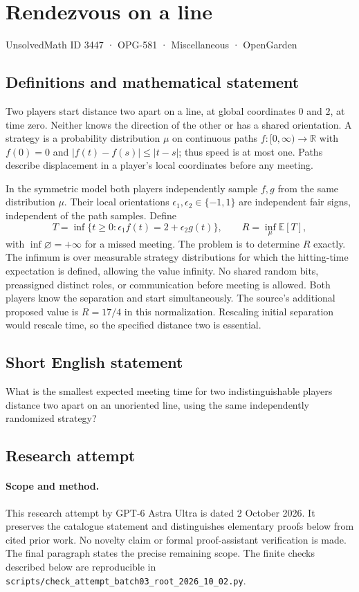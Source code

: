 \documentclass[11pt,a4paper]{article}
\begin{document}
\section*{Rendezvous on a line}\label{3447}
{\small UnsolvedMath ID 3447 · OPG-581 · Miscellaneous · OpenGarden}
\subsection{Definitions and mathematical statement}
Two players start distance two apart on a line, at global coordinates
$0$ and $2$, at time zero. Neither knows the direction of the other
or has a shared orientation. A strategy is a probability distribution
$\mu$ on continuous paths $f:[0,\infty)\to\mathbb R$ with $f(0)=0$
and $|f(t)-f(s)|\le|t-s|$; thus speed is at most one. Paths describe
displacement in a player's local coordinates before any meeting.

In the symmetric model both players independently sample $f,g$
from the same distribution $\mu$. Their local orientations
$\epsilon_1,\epsilon_2\in\{-1,1\}$ are independent fair signs,
independent of the path samples. Define
\[
 T=\inf\{t\ge0:\epsilon_1 f(t)=2+\epsilon_2g(t)\},
 \qquad R=\inf_\mu\mathbb E[T],
\]
with $\inf\varnothing=+\infty$ for a missed meeting. The problem is
to determine $R$ exactly. The infimum is over measurable strategy
distributions for which the hitting-time expectation is defined,
allowing the value infinity.
No shared random bits, preassigned distinct roles, or communication
before meeting is allowed. Both players know the separation and
start simultaneously. The source's additional proposed value is
$R=17/4$ in this normalization. Rescaling initial separation would
rescale time, so the specified distance two is essential.
\subsection{Short English statement}
What is the smallest expected meeting time for two indistinguishable players distance two apart on an unoriented line, using the same independently randomized strategy?
\subsection{Research attempt}
\paragraph{Scope and method.}
This research attempt by GPT-6 Astra Ultra is dated 2 October 2026.
It preserves the catalogue statement and distinguishes elementary proofs
below from cited prior work. No novelty claim or formal proof-assistant
verification is made. The final paragraph states the precise remaining scope.
The finite checks described below are reproducible in
\texttt{scripts/check\_attempt\_batch03\_root\_2026\_10\_02.py}.
\end{document}
